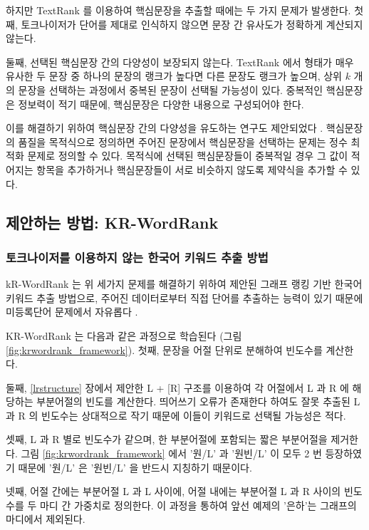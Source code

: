 \documentclass[11pt]{article}
\begin{document}
하지만 TextRank 를 이용하여 핵심문장을 추출할 때에는 두 가지 문제가 발생한다.
첫째, 토크나이저가 단어를 제대로 인식하지 않으면 문장 간 유사도가 정확하게 계산되지 않는다.

둘째, 선택된 핵심문장 간의 다양성이 보장되지 않는다.
TextRank 에서 형태가 매우 유사한 두 문장 중 하나의 문장의 랭크가 높다면 다른 문장도 랭크가 높으며, 상위 $k$ 개의 문장을 선택하는 과정에서 중복된 문장이 선택될 가능성이 있다.
중복적인 핵심문장은 정보력이 적기 때문에, 핵심문장은 다양한 내용으로 구성되어야 한다.

이를 해결하기 위하여 핵심문장 간의 다양성을 유도하는 연구도 제안되었다 \citep{mcdonald2007study, parveen2015topical}.
핵심문장의 품질을 목적식으로 정의하면 주어진 문장에서 핵심문장을 선택하는 문제는 정수 최적화 문제로 정의할 수 있다.
목적식에 선택된 핵심문장들이 중복적일 경우 그 값이 적어지는 항목을 추가하거나 핵심문장들이 서로 비슷하지 않도록 제약식을 추가할 수 있다.


\subsection{제안하는 방법: KR-WordRank}

\subsubsection{토크나이저를 이용하지 않는 한국어 키워드 추출 방법}

kR-WordRank 는 위 세가지 문제를 해결하기 위하여 제안된 그래프 랭킹 기반 한국어 키워드 추출 방법으로, 주어진 데이터로부터 직접 단어를 추출하는 능력이 있기 때문에 미등록단어 문제에서 자유롭다 \citep{kim2014kr}.

KR-WordRank 는 다음과 같은 과정으로 학습된다 (그림 \ref{fig:krwordrank_framework}).
첫째, 문장을 어절 단위로 분해하여 빈도수를 계산한다.

둘째, \ref{lrstructure} 장에서 제안한 L + [R] 구조를 이용하여 각 어절에서 L 과 R 에 해당하는 부분어절의 빈도를 계산한다.
띄어쓰기 오류가 존재한다 하여도 잘못 추출된 L 과 R 의 빈도수는 상대적으로 작기 때문에 이들이 키워드로 선택될 가능성은 적다.

셋째, L 과 R 별로 빈도수가 같으며, 한 부분어절에 포함되는 짧은 부분어절을 제거한다.
그림 \ref{fig:krwordrank_framework} 에서 '원/L' 과 '원빈/L' 이 모두 2 번 등장하였기 때문에 '원/L' 은 '원빈/L' 을 반드시 지칭하기 때문이다.

넷째, 어절 간에는 부분어절 L 과 L 사이에, 어절 내에는 부분어절 L 과 R 사이의 빈도수를 두 마디 간 가중치로 정의한다.
이 과정을 통하여 앞선 예제의 '은하'는 그래프의 마디에서 제외된다.
\end{document}
